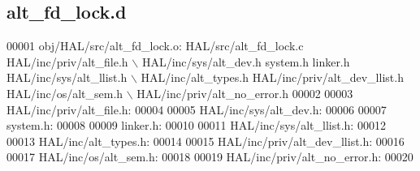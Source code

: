 \subsection{alt\+\_\+fd\+\_\+lock.\+d}
\label{alt__fd__lock_8d_source}

\begin{DoxyCode}
00001 obj/HAL/src/alt_fd_lock.o: HAL/src/alt_fd_lock.c HAL/inc/priv/alt\_file.h \(\backslash\)
 HAL/inc/sys/alt_dev.h system.h linker.h HAL/inc/sys/alt_llist.h \(\backslash\)
 HAL/inc/alt\_types.h HAL/inc/priv/alt_dev_llist.h HAL/inc/os/alt\_sem.h \(\backslash\)
 HAL/inc/priv/alt_no_error.h
00002 
00003 HAL/inc/priv/alt\_file.h:
00004 
00005 HAL/inc/sys/alt_dev.h:
00006 
00007 system.h:
00008 
00009 linker.h:
00010 
00011 HAL/inc/sys/alt_llist.h:
00012 
00013 HAL/inc/alt\_types.h:
00014 
00015 HAL/inc/priv/alt_dev_llist.h:
00016 
00017 HAL/inc/os/alt\_sem.h:
00018 
00019 HAL/inc/priv/alt_no_error.h:
00020 \end{DoxyCode}
